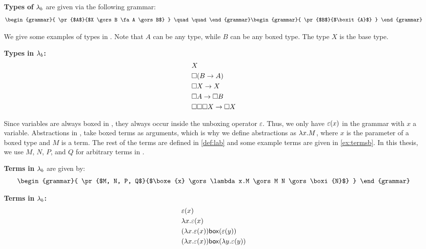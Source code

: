 \begin{definition}
  \label{def:typesb}
  \textbf{Types of \boldmath${\lambda_b}$} are given via the following grammar:
  \begin{align*}
    \begin{grammar}{
      \pr{$A$}{$X \gors B \fa A \gors B$}
 } \quad \quad
    \end{grammar}
    \begin{grammar}{
      \pr{$B$}{$\boxit{A}$}
 }
    \end{grammar}
  \end{align*}
\end{definition}


We give some examples of types in \lab. Note that $A$ can be any type, while $B$ can be any boxed type. 
The type $X$ is the base type. 

\begin{example}
  \label{ex:typesb}
  \textbf{Types in \boldmath${\lambda_b}$:}
  \begin{align*}
    & X \\
    & \square{(B \to A)} \\
    & \square{X} \to X \\
    & \square{A} \to \square{B} \\
    & \square{\square{\square{X}}} \to \square{X}
  \end{align*}
\end{example}

Since variables are always boxed in \lab, they always occur inside the unboxing operator $\varepsilon$.
Thus, we only have $\varepsilon(x)$ in the grammar with $x$ a variable.
Abstractions in \lab, take boxed terms as arguments, which is why we define abstractions as $\lambda {x}.{M}$, where $x$ is the parameter of a boxed type and $M$ is a term.
The rest of the terms are defined in \cref{def:lab} and some example terms are given in \cref{ex:termsb}.
In this thesis, we use $M$, $N$, $P$, and $Q$ for arbitrary terms in \lab.

\begin{definition}
  \label{def:lab}
  \textbf{Terms in \boldmath${\lambda_b}$} are given by:
  \begin{align*}    
    \begin{grammar}{
      \pr{$M, N, P, Q$}{$\boxe{x} \gors \lambda x.M \gors M N \gors \boxi{N}$}
 }
    \end{grammar}
  \end{align*}
\end{definition}

\begin{example}
  \label{ex:termsb}
  \textbf{Terms in \boldmath${\lambda_b}$:}
  \begin{align*}
    & \varepsilon(x) \\
    & \lambda {x}.{\varepsilon(x)} \\
    & (\lambda {x}.{\varepsilon(x)}) \mathsf{box}({\varepsilon(y)}) \\
    & (\lambda {x}.{\varepsilon(x)}) \mathsf{box}({\lambda {y}.{\varepsilon(y)}})
  \end{align*}
\end{example}


